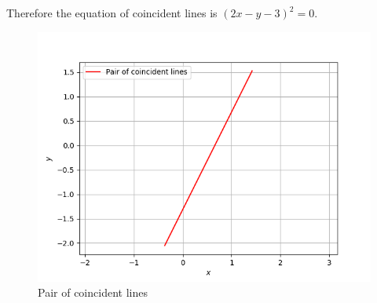 \documentclass[journal,12pt,twocolumn]{IEEEtran}
\providecommand{\brak}[1]{\ensuremath{\left(#1\right)}}
\numberwithin{equation}{subsection}
\begin{document}
Therefore the equation of coincident lines is $\brak{2x-y-3}^2=0$.
\begin{figure}[h]
    \centering
    \includegraphics[width=\columnwidth]{Fig_a6.png}
    \caption{Pair of coincident lines}
    \label{fig:my_label}
\end{figure}
\end{document}

